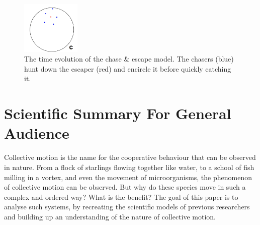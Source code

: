 \documentclass[%
11pt,
amsmath, amssymb,
aps,
pra
]{revtex4-2}
\newcommand{\threeImageSpacing}{0.25\textwidth}
\begin{document}
\begin{figure}[tb]
    \includegraphics[width=\threeImageSpacing]{images/chaseescape/2.png}
    \caption{The time evolution of the chase \& escape model. The chasers (blue) hunt down the escaper (red) and encircle
    it before quickly catching it.}
    \label{fig:chaseescape}
\end{figure}



\newpage\newpage
\section*{Scientific Summary For General Audience}
Collective motion is the name for the cooperative behaviour that can be observed in nature. 
From a flock of starlings flowing together like water, to a school of fish milling in a vortex, 
and even the movement of microorganisms, the phenomenon of collective motion can be observed. 
But why do these species move in such a complex and ordered way? What is the benefit? 
The goal of this paper is to analyse such systems, by recreating the scientific models of previous researchers 
and building up an understanding of the nature of collective motion. 
\end{document}
